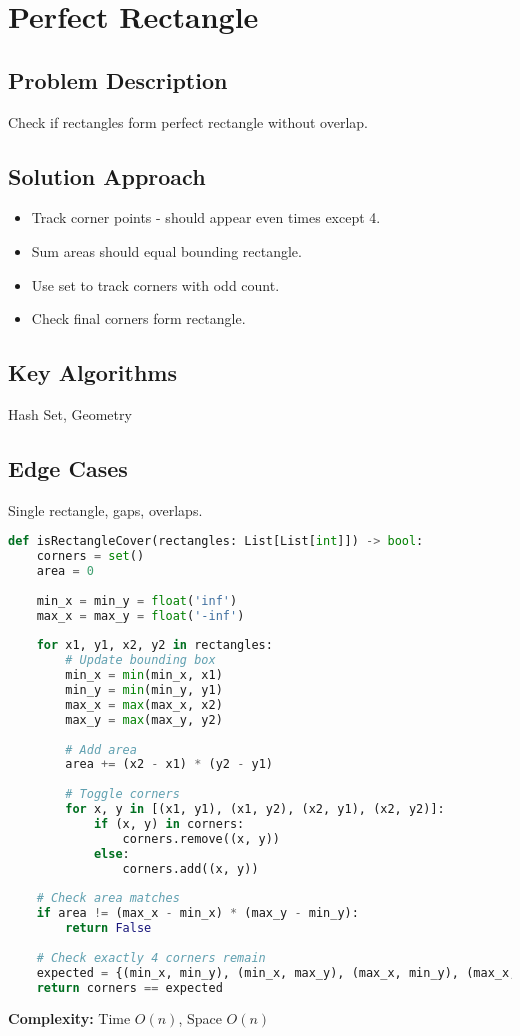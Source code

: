 \documentclass[10pt, a4paper]{article}
\begin{document}
\section{Perfect Rectangle}
\subsection*{Problem Description}
Check if rectangles form perfect rectangle without overlap.

\subsection*{Solution Approach}
\begin{itemize}
    \item Track corner points - should appear even times except 4.
    \item Sum areas should equal bounding rectangle.
    \item Use set to track corners with odd count.
    \item Check final corners form rectangle.
\end{itemize}

\subsection*{Key Algorithms}
Hash Set, Geometry

\subsection*{Edge Cases}
Single rectangle, gaps, overlaps.

\begin{lstlisting}[language=Python]
def isRectangleCover(rectangles: List[List[int]]) -> bool:
    corners = set()
    area = 0
    
    min_x = min_y = float('inf')
    max_x = max_y = float('-inf')
    
    for x1, y1, x2, y2 in rectangles:
        # Update bounding box
        min_x = min(min_x, x1)
        min_y = min(min_y, y1)
        max_x = max(max_x, x2)
        max_y = max(max_y, y2)
        
        # Add area
        area += (x2 - x1) * (y2 - y1)
        
        # Toggle corners
        for x, y in [(x1, y1), (x1, y2), (x2, y1), (x2, y2)]:
            if (x, y) in corners:
                corners.remove((x, y))
            else:
                corners.add((x, y))
    
    # Check area matches
    if area != (max_x - min_x) * (max_y - min_y):
        return False
    
    # Check exactly 4 corners remain
    expected = {(min_x, min_y), (min_x, max_y), (max_x, min_y), (max_x, max_y)}
    return corners == expected
\end{lstlisting}
\textbf{Complexity:} Time $O(n)$, Space $O(n)$
\end{document}
